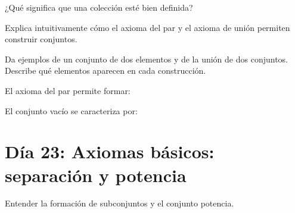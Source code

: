 \begin{activity}[id=dia-22-corta-06,type=short,weight=1]

¿Qué significa que una colección esté bien definida?

\end{activity}

\begin{activity}[id=dia-22-desarrollo-01,type=long,weight=2]

Explica intuitivamente cómo el axioma del par y el axioma de unión permiten construir conjuntos.

\end{activity}

\begin{activity}[id=dia-22-desarrollo-02,type=long,weight=2]

Da ejemplos de un conjunto de dos elementos y de la unión de dos conjuntos. Describe qué elementos aparecen en cada construcción.

\end{activity}

\begin{activity}[id=dia-22-opcion-01,type=choice,weight=1]

El axioma del par permite formar:





\end{activity}

\begin{activity}[id=dia-22-opcion-02,type=choice,weight=1]

El conjunto vacío se caracteriza por:





\end{activity}

\section{Día 23: Axiomas básicos: separación y potencia}

\begin{lesson}[id=dia-23-lectura,weight=0]

Entender la formación de subconjuntos y el conjunto potencia.

\end{lesson}

